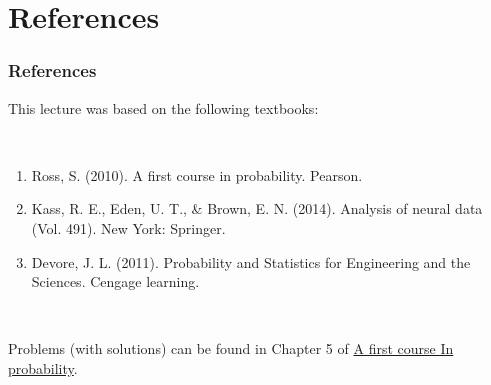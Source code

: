 \documentclass[9pt]{beamer}
\begin{document}
\section{References}
\begin{frame}
\frametitle{References}


This lecture was based on the following textbooks:

\

\begin{enumerate}[label=\arabic*.]
\item Ross, S. (2010). A first course in probability. Pearson.
\item Kass, R. E., Eden, U. T., \& Brown, E. N. (2014). Analysis of neural data (Vol. 491). New York: Springer.
\item Devore, J. L. (2011). Probability and Statistics for Engineering and the Sciences. Cengage learning.
\end{enumerate}

\
 
Problems (with solutions) can be found in Chapter 5 of \href{http://www.gatsby.ucl.ac.uk/~rapela/gcnuBridging2023/books/ross10-aFirstCourseInProbability.pdf}{A first course In probability}.

\end{frame}








\end{document}
